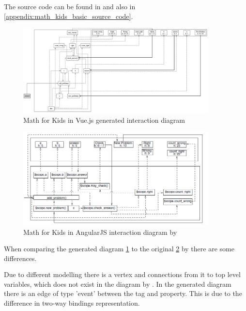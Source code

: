 The source code can be found in  and also in \ref{appendix:math_kids_basic_source_code}.
\begin{figure}[H]
    \centering
    \includegraphics[width=0.9\textwidth]{images/diagram_own_math_kids.png}
     \caption{Math for Kids in Vue.js generated interaction diagram }
     \label{fig:math_for_kids_own_interaction_diagram}
\end{figure}

\begin{figure}[H]
    \centering
    \includegraphics[width=0.9\textwidth]{images/interaction_diagram_zhang.png}
     \caption{Math for Kids in AngularJS interaction diagram by \textcite{zhang2019scenario}}
     \label{fig:math_for_kids_zhang_interaction_diagram}
\end{figure}

When comparing the generated diagram \ref{fig:math_for_kids_own_interaction_diagram} to the original \ref{fig:math_for_kids_zhang_interaction_diagram} by \textcite{zhang2019scenario}  there are some differences.

Due to different modelling there is a  vertex and connections from it to top level variables, which does not exist in the diagram by \textcite{zhang2019scenario}. In the generated diagram there is an edge of type 'event' between the  tag and  property. This is due to the difference in two-way bindings representation.

